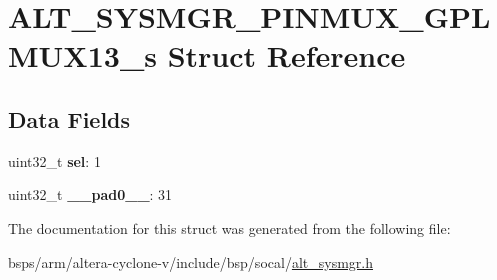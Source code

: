 \hypertarget{structALT__SYSMGR__PINMUX__GPLMUX13__s}{}\section{A\+L\+T\+\_\+\+S\+Y\+S\+M\+G\+R\+\_\+\+P\+I\+N\+M\+U\+X\+\_\+\+G\+P\+L\+M\+U\+X13\+\_\+s Struct Reference}
\label{structALT__SYSMGR__PINMUX__GPLMUX13__s}
\subsection*{Data Fields}
\begin{DoxyCompactItemize}
\item 
\mbox{\label{structALT__SYSMGR__PINMUX__GPLMUX13__s_a52fc4dbf72c7079c871674d4e9a14e56}} 
uint32\+\_\+t {\bfseries sel}\+: 1
\item 
\mbox{\label{structALT__SYSMGR__PINMUX__GPLMUX13__s_a140042547b7f5dc3cd3a66c0454ae102}} 
uint32\+\_\+t {\bfseries \+\_\+\+\_\+pad0\+\_\+\+\_\+}\+: 31
\end{DoxyCompactItemize}


The documentation for this struct was generated from the following file\+:\begin{DoxyCompactItemize}
\item 
bsps/arm/altera-\/cyclone-\/v/include/bsp/socal/\mbox{\hyperlink{alt__sysmgr_8h}{alt\+\_\+sysmgr.\+h}}\end{DoxyCompactItemize}
